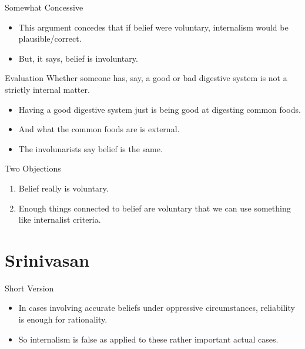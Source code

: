 \documentclass[
  17pt,
  letterpaper,
  ignorenonframetext,
  aspectratio=169,
  handout]{beamer}
\providecommand{\tightlist}{%
  \setlength{\itemsep}{0pt}\setlength{\parskip}{0pt}}\usepackage{longtable,booktabs,array}
\begin{document}
\begin{frame}{Somewhat Concessive}
\protect\hypertarget{somewhat-concessive}{}
\begin{itemize}[<+->]
\tightlist
\item
  This argument concedes that if belief were voluntary, internalism
  would be plausible/correct.
\item
  But, it says, belief is involuntary.
\end{itemize}
\end{frame}

\begin{frame}{Evaluation}
\protect\hypertarget{evaluation}{}
Whether someone has, say, a good or bad digestive system is not a
strictly internal matter.

\begin{itemize}[<+->]
\tightlist
\item
  Having a good digestive system just is being good at digesting common
  foods.
\item
  And what the common foods are is external.
\item
  The involunarists say belief is the same.
\end{itemize}
\end{frame}

\begin{frame}{Two Objections}
\protect\hypertarget{two-objections}{}
\begin{enumerate}[<+->]
\tightlist
\item
  Belief really is voluntary.
\item
  Enough things connected to belief are voluntary that we can use
  something like internalist criteria.
\end{enumerate}
\end{frame}

\hypertarget{srinivasan}{%
\section{Srinivasan}\label{srinivasan}}

\begin{frame}{Short Version}
\protect\hypertarget{short-version}{}
\begin{itemize}[<+->]
\tightlist
\item
  In cases involving accurate beliefs under oppressive circumstances,
  reliability is enough for rationality.
\item
  So internalism is false as applied to these rather important actual
  cases.
\end{itemize}
\end{frame}
\end{document}
